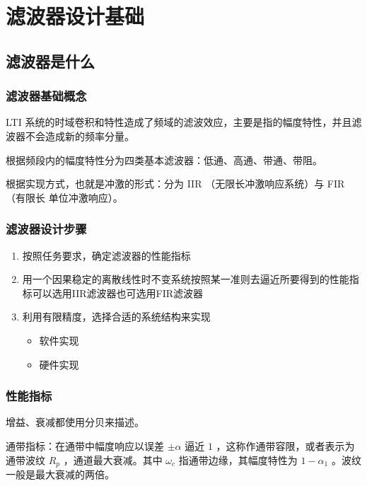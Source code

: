 \documentclass[cn,11pt,chinese,black,simple]{elegantbook}
\begin{document}
\fi 
\def\chapname{05filter}

\chapter{滤波器设计基础}

\section{滤波器是什么}

\subsection{滤波器基础概念}

LTI 系统的时域卷积和特性造成了频域的滤波效应，主要是指的幅度特性，并且滤波器不会造成新的频率分量。

根据频段内的幅度特性分为四类基本滤波器：低通、高通、带通、带阻。

根据实现方式，也就是冲激的形式：分为 IIR （无限长冲激响应系统）与 FIR （有限长 单位冲激响应）。

\subsection{滤波器设计步骤}


\begin{enumerate}
    \item 按照任务要求，确定滤波器的性能指标
    \item 用一个因果稳定的离散线性时不变系统按照某一准则去逼近所要得到的性能指标可以选用IIR滤波器也可选用FIR滤波器
    \item 利用有限精度，选择合适的系统结构来实现
    \begin{itemize}
        \item 软件实现
        \item 硬件实现
    \end{itemize}
\end{enumerate}

\subsection{性能指标}

增益、衰减都使用分贝来描述。

通带指标：在通带中幅度响应以误差 \(\pm \alpha\) 逼近 \(1\) ，这称作通带容限，或者表示为通带波纹 \(R_p\) ，通道最大衰减。其中 \(\omega_c\) 指通带边缘，其幅度特性为 \(1 - \alpha_1\) 。波纹一般是最大衰减的两倍。
\end{document}
